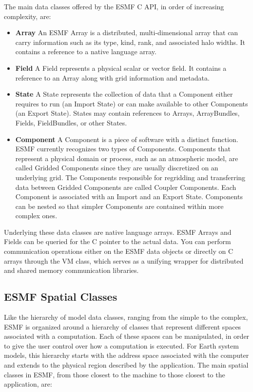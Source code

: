 The main data classes offered by the ESMF C API, in order of increasing complexity, are:
\begin{itemize}
\item {\bf Array} An ESMF Array is a distributed, multi-dimensional 
array that can carry information such as its type, kind, rank, and 
associated halo widths.  It contains a reference to a native language array.
\item {\bf Field}  A Field represents a physical scalar or vector field.
It contains a reference to an Array along with grid information and metadata.
\item {\bf State}  A State represents the collection of data that a 
Component either requires to run (an Import State) or can make 
available to other Components (an Export State).
States may contain references to Arrays, ArrayBundles, Fields,
FieldBundles, or other States. 
\item {\bf Component}  A Component is a piece of software 
with a distinct function.  ESMF currently recognizes two types 
of Components.  Components that represent a physical domain 
or process, such 
as an atmospheric model, are called Gridded Components since they are 
usually discretized on an underlying grid.  The Components 
responsible for regridding and transferring data between Gridded 
Components are called Coupler Components.  Each Component
is associated with an Import and an Export State.  Components
can be nested so that simpler Components are contained within more
complex ones.

\end{itemize}

Underlying these data classes are native language arrays.  ESMF Arrays 
and Fields can be queried for the C pointer to the actual data.  You can
perform communication operations either on the ESMF data objects or
directly on C arrays through the VM class, which serves 
as a unifying wrapper for distributed and shared memory communication 
libraries.

\subsection{ESMF Spatial Classes}
\label{sec:spatialclasses}

Like the hierarchy of model data classes, ranging from the 
simple to the complex, ESMF is organized around a hierarchy of
classes that represent different spaces associated with a computation.
Each of these spaces can be manipulated, in order to give
the user control over how a computation is executed.  For Earth system
models, this hierarchy starts with the address space associated
with the computer and extends to the physical region described by
the application.   The main spatial classes in ESMF, from
those closest to the machine to those closest to the application, are:

